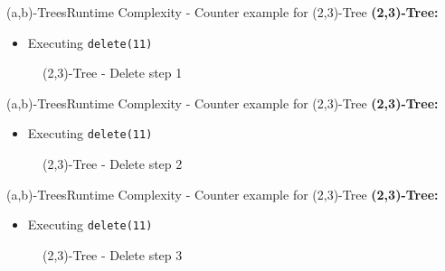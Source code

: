 \begin{frame}{(a,b)-Trees}{Runtime Complexity - Counter example for (2,3)-Tree}
  \textbf{(2,3)-Tree:}
  \begin{itemize}
  \item
    Executing \texttt{\color{Mittel-Blau}delete(11)}
  \end{itemize}
  \begin{figure}
    \begin{adjustbox}{width=0.6\linewidth}
      
    \end{adjustbox}
    \label{fig:a_b_tree:2_3_tree_2}
    \caption{(2,3)-Tree - Delete step 1}
  \end{figure}
\end{frame}


\begin{frame}{(a,b)-Trees}{Runtime Complexity - Counter example for (2,3)-Tree}
  \textbf{(2,3)-Tree:}
  \begin{itemize}
    \item
      Executing \texttt{\color{Mittel-Blau}delete(11)}
  \end{itemize}
  \begin{figure}
    \begin{adjustbox}{width=0.6\linewidth}
      
    \end{adjustbox}
    \label{fig:a_b_tree:2_3_tree_3}
    \caption{(2,3)-Tree - Delete step 2}
  \end{figure}
\end{frame}


\begin{frame}{(a,b)-Trees}{Runtime Complexity - Counter example for (2,3)-Tree}
  \textbf{(2,3)-Tree:}
  \begin{itemize}
    \item
      Executing \texttt{\color{Mittel-Blau}delete(11)}
  \end{itemize}
  \begin{figure}
    \begin{adjustbox}{width=0.6\linewidth}
      
    \end{adjustbox}
    \label{fig:a_b_tree:2_3_tree_4}
    \caption{(2,3)-Tree - Delete step 3}
  \end{figure}
\end{frame}

